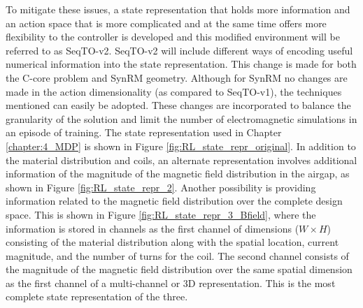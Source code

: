 To mitigate these issues, a state representation that holds more information and an action space that is more complicated and at the same time offers more flexibility to the controller is developed and this modified environment will be referred to as SeqTO-v2. SeqTO-v2 will include different ways of encoding useful numerical information into the state representation. This change is made for both the C-core problem and SynRM geometry. Although for SynRM no changes are made in the action dimensionality (as compared to SeqTO-v1), the techniques mentioned can easily be adopted. These changes are incorporated to balance the granularity of the solution and limit the number of electromagnetic simulations in an episode of training. The state representation used in Chapter \ref{chapter:4_MDP} is shown in Figure \ref{fig:RL_state_repr_original}. In addition to the material distribution and coils, an alternate representation involves additional information of the magnitude of the magnetic field distribution in the airgap, as shown in Figure \ref{fig:RL_state_repr_2}. Another possibility is providing information related to the magnetic field distribution over the complete design space. This is shown in Figure \ref{fig:RL_state_repr_3_Bfield}, where the information is stored in channels as the first channel of dimensions ($W \times H$) consisting of the material distribution along with the spatial location, current magnitude, and the number of turns for the coil. The second channel consists of the magnitude of the magnetic field distribution over the same spatial dimension as the first channel of a multi-channel or 3D representation. This is the most complete state representation of the three.  

